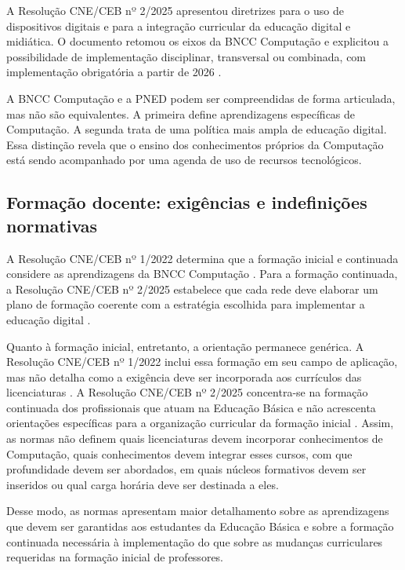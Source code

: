 A Resolução CNE/CEB nº 2/2025 apresentou diretrizes para o uso de dispositivos digitais e para a integração curricular da educação digital e midiática. O documento retomou os eixos da BNCC Computação e explicitou a possibilidade de implementação disciplinar, transversal ou combinada, com implementação obrigatória a partir de 2026 \cite{brasil2025resolucao2}.

A BNCC Computação e a PNED podem ser compreendidas de forma articulada, mas não são equivalentes. A primeira define aprendizagens específicas de Computação. A segunda trata de uma política mais ampla de educação digital. Essa distinção revela que o ensino dos conhecimentos próprios da Computação está sendo acompanhado por uma agenda de uso de recursos tecnológicos.

\subsection{Formação docente: exigências e indefinições normativas}
\label{subsec:formacao-docente-normas}

A Resolução CNE/CEB nº 1/2022 determina que a formação inicial e continuada considere as aprendizagens da BNCC Computação \cite{brasil2022resolucao1}. Para a formação continuada, a Resolução CNE/CEB nº 2/2025 estabelece que cada rede deve elaborar um plano de formação coerente com a estratégia escolhida para implementar a educação digital \cite{brasil2025resolucao2}.

Quanto à formação inicial, entretanto, a orientação permanece genérica. A Resolução CNE/CEB nº 1/2022 inclui essa formação em seu campo de aplicação, mas não detalha como a exigência deve ser incorporada aos currículos das licenciaturas \cite{brasil2022resolucao1}. A Resolução CNE/CEB nº 2/2025 concentra-se na formação continuada dos profissionais que atuam na Educação Básica e não acrescenta orientações específicas para a organização curricular da formação inicial \cite{brasil2025resolucao2}. Assim, as normas não definem quais licenciaturas devem incorporar conhecimentos de Computação, quais conhecimentos devem integrar esses cursos, com que profundidade devem ser abordados, em quais núcleos formativos devem ser inseridos ou qual carga horária deve ser destinada a eles.

Desse modo, as normas apresentam maior detalhamento sobre as aprendizagens que devem ser garantidas aos estudantes da Educação Básica e sobre a formação continuada necessária à implementação do que sobre as mudanças curriculares requeridas na formação inicial de professores.

